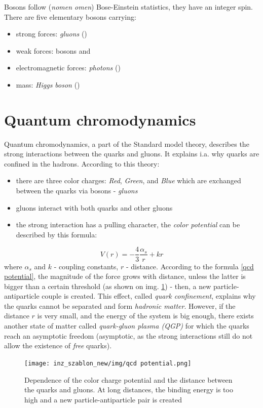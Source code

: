    
Bosons follow (\emph{nomen omen}) Bose-Einstein statistics, they have an integer spin. There are five elementary bosons carrying: 
\begin{itemize}
    \item strong forces: \emph{gluons} (\Pg)
    \item weak forces: bosons \PWpm and \PZz
    \item electromagnetic forces: \emph{photons} (\Pgg)
    \item mass: \emph{Higgs boson} (\PH) 
\end{itemize}

\section{Quantum chromodynamics}
Quantum chromodynamics, a part of the Standard model theory, describes the strong interactions between the quarks and gluons. It explains i.a. why quarks are confined in the hadrons\cite{zbroszczyk}. According to this theory:
\begin{itemize}
    \item there are three color charges: \emph{Red}, \emph{Green}, and \emph{Blue} which are exchanged between the quarks via bosons - \emph{gluons}
    \item gluons interact with both quarks and other gluons
    \item the strong interaction has a pulling character, the \emph{color potential} can be described by this formula:
\end{itemize}
\begin{equation} \label{qcd potential}
    V (r) = - \frac{4}{3} \frac{\alpha_s}{r} + kr 
\end{equation}
where $\alpha_s$ and $k$ - coupling constants, $r$ - distance.
According to the formula \ref{qcd potential}, the magnitude of the force grows with distance, unless the latter is bigger than a certain threshold (as shown on img. \ref{qcd graph}) - then, a new particle-antiparticle couple is created. This effect, called \emph{quark confinement}, explains why the quarks cannot be separated and form \emph{hadronic matter}. However, if the distance $r$ is very small, and the energy of the system is big enough, there exists another state of matter called \emph{quark-gluon plasma (QGP)} for which the quarks reach an asymptotic freedom (asymptotic, as the strong interactions still do not allow the existence of \emph{free} quarks).
\begin{figure}[H]
    \centering
    \texttt{[image: inz\_szablon\_new/img/qcd potential.png]}
    \caption{Dependence of the color charge potential and the distance between the quarks and gluons. At long distances, the binding energy is too high and a new particle-antiparticle pair is created \cite{grebieszkow}}
    \label{qcd graph}
 \end{figure}
